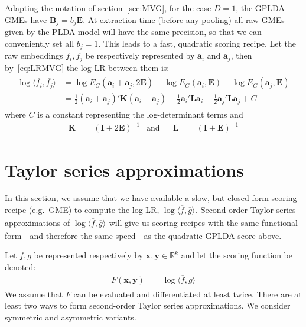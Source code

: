 \documentclass[a4paper,oneside,12pt,english]{report}
\def\expv#1#2{\bigl\langle#1\bigr\rangle_{#2}}
\def\R{\mathbb{R}}
\def\Lmat{\mathbf{L}}
\def\Bmat{\mathbf{B}}
\def\Emat{\mathbf{E}}
\def\Imat{\mathbf{I}}
\def\Kmat{\mathbf{K}}
\def\yvec{\mathbf{y}}
\def\xvec{\mathbf{x}}
\def\avec{\mathbf{a}}
\def\dot#1#2{\expv{#1,#2}{}}
\def\normal#1{\overline{#1}}
\def\dotn#1#2{\dot{\normal{#1}}{\normal{#2}}}
\begin{document}
Adapting the notation of section~\ref{sec:MVG}, for the case $D=1$, the GPLDA GMEs have $\Bmat_j=b_j\Emat$. At extraction time (before any pooling) all raw GMEs given by the PLDA model will have the same precision, so that we can conveniently set all $b_j=1$. This leads to a fast, quadratic scoring recipe. Let the raw embeddings $f_i,f_j$ be respectively represented by $\avec_i$ and $\avec_j$, then by~\eqref{eq:LRMVG} the log-LR between them is:
\begin{align}
\label{eq:PLDAscore}
\begin{split}
\log\dotn{f_i}{f_j} &=\log E_G(\avec_i+\avec_j,2\Emat)  -\log E_G(\avec_i,\Emat) -\log E_G(\avec_j,\Emat) \\
&= \frac12(\avec_i+\avec_j)' \Kmat (\avec_i+\avec_j)
-\frac12\avec_i' \Lmat \avec_i -\frac12\avec_j' \Lmat \avec_j + C
\end{split}
\end{align} 
where $C$ is a constant representing the log-determinant terms and
\begin{align}
\Kmat &= (\Imat+2\Emat)^{-1}&\text{and} && \Lmat &=(\Imat+\Emat)^{-1}
\end{align}

\section{Taylor series approximations}
\label{sec:TSapr}
In this section, we assume that we have available a slow, but closed-form scoring recipe (e.g.\ GME) to compute the log-LR, $\log\dotn{f}{g}$. Second-order Taylor series approximations of $\log\dotn{f}{g}$ will give us scoring recipes with the same functional form---and therefore the same speed---as the quadratic GPLDA score above. 

Let $f,g$ be represented respectively by $\xvec,\yvec\in\R^k$ and let the scoring function be denoted: 
\begin{align}
F(\xvec,\yvec) &= \log\dotn{f}{g}
\end{align} 
We assume that $F$ can be evaluated and differentiated at least twice. There are at least two ways to form second-order Taylor series approximations. We consider symmetric and asymmetric variants.
\end{document}
